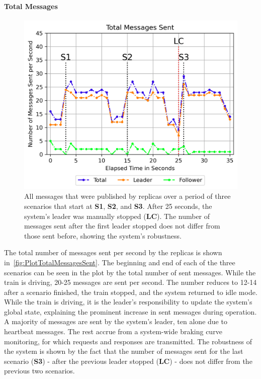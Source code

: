 \paragraph{Total Messages}

\begin{figure}[!hb]
	\centering
	\includegraphics[width=0.8\linewidth]{images/plots/TotalMessagesSent}
	\caption{All messages that were published by replicas over a period of three scenarios that start at \textbf{S1}, \textbf{S2}, and \textbf{S3}. After 25 seconds, the system's leader was manually stopped (\textbf{LC}). The number of messages sent after the first leader stopped does not differ from those sent before, showing the system's robustness.}
	\label{fig:PlotTotalMessagesSent}
\end{figure}

The total number of messages sent per second by the replicas is shown in~\autoref{fig:PlotTotalMessagesSent}.
The beginning and end of each of the three scenarios can be seen in the plot by the total number of sent messages.
While the train is driving, 20-25 messages are sent per second.
The number reduces to 12-14 after a scenario finished, the train stopped, and the system returned to idle mode.
While the train is driving, it is the leader's responsibility to update the system's global state, explaining the prominent increase in sent messages during operation.
A majority of messages are sent by the system's leader, ten alone due to heartbeat messages.
The rest accrue from a system-wide braking curve monitoring, for which requests and responses are transmitted.
The robustness of the system is shown by the fact that the number of messages sent for the last scenario (\textbf{S3}) - after the previous leader stopped (\textbf{LC}) - does not differ from the previous two scenarios.

